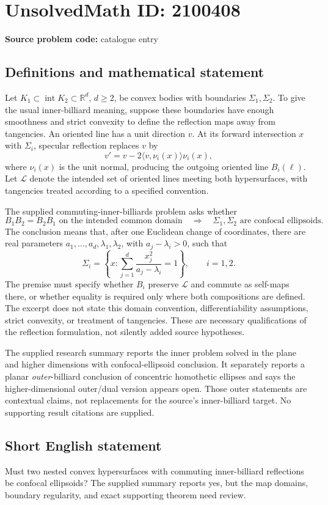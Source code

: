 \documentclass[11pt]{article}
\newcommand{\R}{\mathbb{R}}
\begin{document}
\section*{UnsolvedMath ID: 2100408}
\textbf{Source problem code:} catalogue entry
\subsection{Definitions and mathematical statement}
Let \(K_1\subset\operatorname{int}K_2\subset\R^d\), \(d\ge2\), be convex bodies with boundaries \(\Sigma_1,\Sigma_2\). To give the usual inner-billiard meaning, suppose these boundaries have enough smoothness and strict convexity to define the reflection maps away from tangencies. An oriented line has a unit direction \(v\). At its forward intersection \(x\) with \(\Sigma_i\), specular reflection replaces \(v\) by
\[
v'=v-2\langle v,\nu_i(x)\rangle\nu_i(x),
\]
where \(\nu_i(x)\) is the unit normal, producing the outgoing oriented line \(B_i(\ell)\). Let \(\mathcal L\) denote the intended set of oriented lines meeting both hypersurfaces, with tangencies treated according to a specified convention.

The supplied commuting-inner-billiards problem asks whether
\[
B_1B_2=B_2B_1\text{ on the intended common domain}
\quad\Longrightarrow\quad
\Sigma_1,\Sigma_2\text{ are confocal ellipsoids}.
\]
The conclusion means that, after one Euclidean change of coordinates, there are real parameters \(a_1,\ldots,a_d,\lambda_1,\lambda_2\), with \(a_j-\lambda_i>0\), such that
\[
\Sigma_i=\left\{x:\sum_{j=1}^d\frac{x_j^2}{a_j-\lambda_i}=1\right\},\qquad i=1,2.
\]
The premise must specify whether \(B_i\) preserve \(\mathcal L\) and commute as self-maps there, or whether equality is required only where both compositions are defined. The excerpt does not state this domain convention, differentiability assumptions, strict convexity, or treatment of tangencies. These are necessary qualifications of the reflection formulation, not silently added source hypotheses.

The supplied research summary reports the inner problem solved in the plane and higher dimensions with confocal-ellipsoid conclusion. It separately reports a planar \emph{outer}-billiard conclusion of concentric homothetic ellipses and says the higher-dimensional outer/dual version appears open. Those outer statements are contextual claims, not replacements for the source's inner-billiard target. No supporting result citations are supplied.
\subsection{Short English statement}
Must two nested convex hypersurfaces with commuting inner-billiard reflections be confocal ellipsoids? The supplied summary reports yes, but the map domains, boundary regularity, and exact supporting theorem need review.
\end{document}
